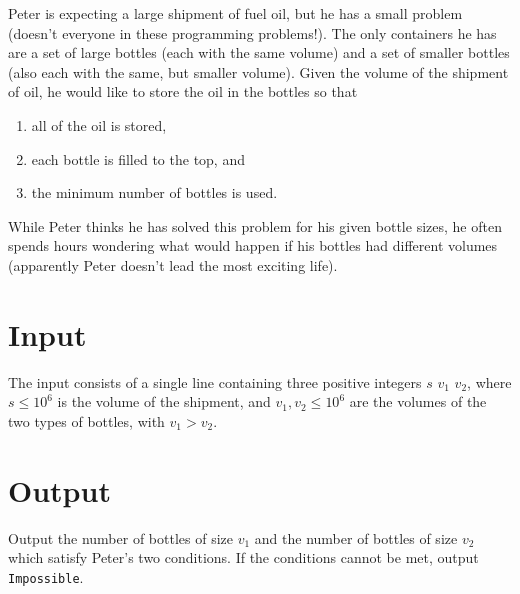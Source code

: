 
 Peter is expecting a large shipment of fuel oil, but he has a small problem (doesn't everyone in these programming problems!).  The only containers he has are a set of large bottles (each with the same volume) and a set of smaller bottles (also each with the same, but smaller volume).  Given the volume of the shipment of oil, he would like to store the oil in the bottles so that
\begin{enumerate}
\item all of the oil is stored,
\item each bottle is filled to the top, and
\item the minimum number of bottles is used.
\end{enumerate}
While Peter thinks he has solved this problem for his given bottle sizes, he
often spends hours wondering what would happen if his bottles had different
volumes (apparently Peter doesn't lead the most exciting life).

\section*{Input}

The input consists of a single line containing three positive integers $s$
$v_1$ $v_2$, where $s \leq 10^6$ is the volume of the shipment, and
$v_1, v_2 \leq 10^6$ are the volumes of the two types of bottles, with
$v_1 > v_2$.

\section*{Output}

Output the number of bottles of size $v_1$ and the number of bottles of size
$v_2$ which satisfy Peter's two conditions.  If the conditions cannot be met,
output {\tt Impossible}.

